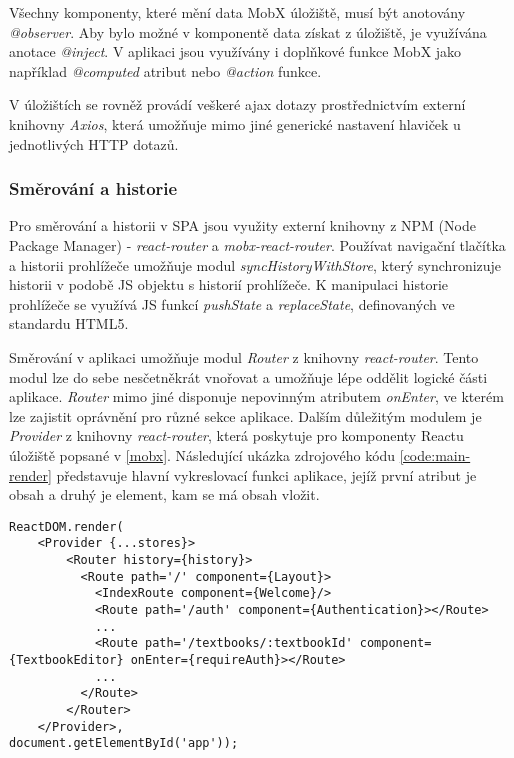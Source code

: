 \documentclass[a4paper,11pt,titlepage,fleqn]{article}
\begin{document}
            Všechny komponenty, které mění data MobX úložiště, musí být anotovány \textit{@observer}. Aby bylo možné v komponentě data získat z úložiště, je využívána anotace \textit{@inject}. V aplikaci jsou využívány i doplňkové funkce MobX jako například \textit{@computed} atribut nebo \textit{@action} funkce. 

            V úložištích se rovněž provádí veškeré \gls{ajax} dotazy prostřednictvím externí knihovny \textit{Axios}, která umožňuje mimo jiné generické nastavení hlaviček u jednotlivých HTTP dotazů. 
        
        \subsubsection{Směrování a historie}
            Pro směrování a historii v SPA jsou využity externí knihovny z NPM (Node Package Manager) - \textit{react-router} a \textit{mobx-react-router}. Používat navigační tlačítka a historii prohlížeče umožňuje modul \textit{syncHistoryWithStore}, který synchronizuje historii v podobě JS objektu s historií prohlížeče. K manipulaci historie prohlížeče se využívá JS funkcí \textit{pushState} a \textit{replaceState}, definovaných ve standardu HTML5.

            Směrování v aplikaci umožňuje modul \textit{Router} z knihovny \textit{react-router}. Tento modul lze do sebe nesčetněkrát vnořovat a umožňuje lépe oddělit logické části aplikace. \textit{Router} mimo jiné disponuje nepovinným atributem \textit{onEnter}, ve kterém lze zajistit oprávnění pro různé sekce aplikace. Dalším důležitým modulem je \textit{Provider} z knihovny \textit{react-router}, která poskytuje pro komponenty Reactu úložiště popsané v \ref{mobx}. Následující ukázka zdrojového kódu \ref{code:main-render} představuje hlavní vykreslovací funkci aplikace, jejíž první atribut je obsah a druhý je element, kam se má obsah vložit.

\begin{lstlisting}[language=JS, caption={Hlavní renderovací funkce aplikace},label=code:main-render]
ReactDOM.render(
    <Provider {...stores}>
        <Router history={history}>
          <Route path='/' component={Layout}>
            <IndexRoute component={Welcome}/>
            <Route path='/auth' component={Authentication}></Route>
            ...
            <Route path='/textbooks/:textbookId' component={TextbookEditor} onEnter={requireAuth}></Route>
            ...
          </Route>
        </Router>
    </Provider>,
document.getElementById('app'));
\end{lstlisting}
\end{document}
